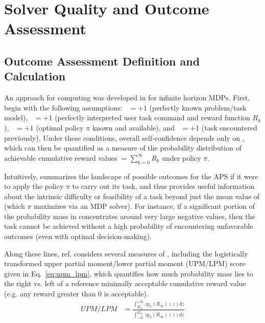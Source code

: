 \section{Solver Quality and Outcome Assessment}

\subsection{Outcome Assessment Definition and Calculation} \label{sec:xO}
An approach for computing \xO{} was developed in \cite{Aitken2016-cv} for infinite horizon MDPs. First, begin with the following assumptions: \xM~$=+1$ (perfectly known problem/task model), \xI~$= +1$ (perfectly interpreted user task command and reward function $R_k$), \xQ~$=+1$ (optimal policy $\pi$ known and available), and \xP~$=+1$ (task encountered previously). Under these conditions, overall self-confidence depends only on \xO{}, which can then be quantified as a measure of the probability distribution \ppiri{} of achievable cumulative reward values $ $\ri$= \sum_{k=0}^{\infty}R_{k}$ under policy $\pi$.

Intuitively, \ppiri{} summarizes the landscape of possible outcomes for the APS if it were to apply the policy $\pi$ to carry out its task, and thus provides useful information about the intrinsic difficulty or feasibility of a task beyond just the mean value of \ri{} (which $\pi$ maximizes via an MDP solver). For instance, if a significant portion of the probability mass in \ppiri{} concentrates around very large negative values, then the task cannot be achieved without a high probability of encountering unfavorable outcomes (even with optimal decision-making). 

Along these lines, ref. \cite{Aitken2016-cv} considers several measures of \ppiri, including the logistically transformed upper partial moment/lower partial moment (UPM/LPM) score given in Eq.~\ref{eq:upm_lpm}, which quantifies how much probability mass lies to the right vs. left of a reference minimally acceptable cumulative reward value \ris{} (e.g. any reward greater than 0 is acceptable).
    \begin{align}
        UPM/LPM &= \frac{\int_{R^*_{\infty}}^{+\infty}zp_{\pi}(R_{\infty})(z)dz}{\int_{-\infty}^{R^*_{\infty}} zp_{\pi}(R_{\infty})(z)dz} \label{eq:upm_lpm}
    \end{align}

